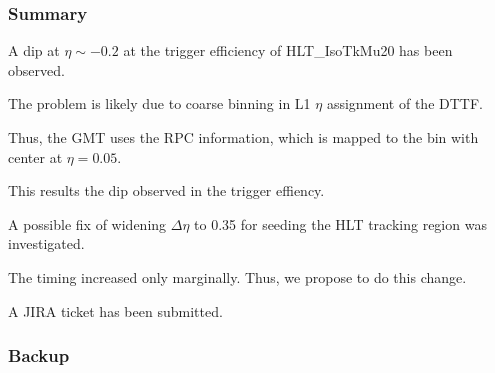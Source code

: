 
\begin{frame}
\frametitle{Summary}
\bi
\item A dip at $\eta\sim-0.2$ at the trigger efficiency of HLT\_IsoTkMu20 has been observed.
\item The problem is {\red likely due to coarse binning in L1 $\eta$ assignment of the DTTF}.
\item Thus, the GMT uses the RPC information, which is {\red mapped to the bin with center at $\eta = 0.05$}.
\item This results the dip observed in the trigger effiency.
\emptyitemspace
\item {\blue A possible fix of widening $\Delta\eta$ to 0.35 for seeding the HLT tracking region was investigated.}
\item {\red The timing increased only marginally.} Thus, we propose to do this change.
\item A JIRA ticket has been submitted.
\emptyitemspace
\ei
\end{frame}


\appendix
\backupbegin

\begin{frame}
\frametitle{Backup}
\end{frame}






\backupend

